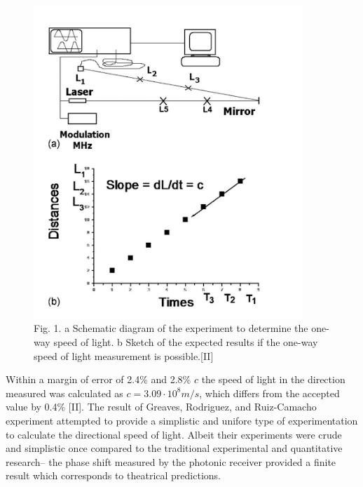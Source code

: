 \documentclass[12pt,letterpaper]{article}
\begin{document}
\begin{figure}[H]
    \centering
    \includegraphics[width=4in]{LatinLight.png}
    \caption{Fig. 1. a Schematic diagram of the experiment to determine the one-way speed of light. b Sketch of the expected results if the one-way speed of light measurement is possible.[II]}
\end{figure}
 Within a margin of error of  2.4\% and 2.8\%  $c$ the speed of light in the direction measured was calculated as $c=3.09 \cdot 10^8 m/s$, which differs from the accepted value by 0.4\% [II]. The result of Greaves, Rodriguez, and Ruiz-Camacho experiment attempted to provide a simplistic and unifore type of experimentation to calculate the directional speed of light. Albeit their experiments were crude and simplistic once compared to the traditional experimental and quantitative research– the phase shift measured by the photonic receiver provided a finite result which corresponds to theatrical predictions. 
\end{document}
